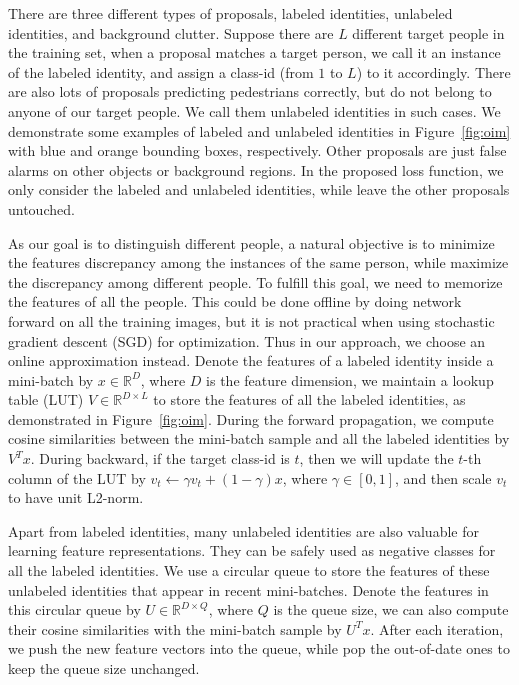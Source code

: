 There are three different types of proposals, labeled identities, unlabeled identities, and background clutter. Suppose there are $L$ different target people in the training set, when a proposal matches a target person, we call it an instance of the labeled identity, and assign a class-id (from $1$ to $L$) to it accordingly. There are also lots of proposals predicting pedestrians correctly, but do not belong to anyone of our target people. We call them unlabeled identities in such cases. We demonstrate some examples of labeled and unlabeled identities in Figure~\ref{fig:oim} with blue and orange bounding boxes, respectively. Other proposals are just false alarms on other objects or background regions. In the proposed loss function, we only consider the labeled and unlabeled identities, while leave the other proposals untouched.

As our goal is to distinguish different people, a natural objective is to minimize the features discrepancy among the instances of the same person, while maximize the discrepancy among different people. To fulfill this goal, we need to memorize the features of all the people. This could be done offline by doing network forward on all the training images, but it is not practical when using stochastic gradient descent (SGD) for optimization. Thus in our approach, we choose an online approximation instead. Denote the features of a labeled identity inside a mini-batch by $x\in \mathbb{R}^D$, where $D$ is the feature dimension, we maintain a lookup table (LUT) $V\in \mathbb{R}^{D\times L}$ to store the features of all the labeled identities, as demonstrated in Figure~\ref{fig:oim}. During the forward propagation, we compute cosine similarities between the mini-batch sample and all the labeled identities by $V^T x$. During backward, if the target class-id is $t$, then we will update the $t$-th column of the LUT by $v_t \gets \gamma v_t + (1-\gamma) x$, where $\gamma \in [0, 1]$, and then scale $v_t$ to have unit L2-norm.

Apart from labeled identities, many unlabeled identities are also valuable for learning feature representations. They can be safely used as negative classes for all the labeled identities. We use a circular queue to store the features of these unlabeled identities that appear in recent mini-batches. Denote the features in this circular queue by $U\in \mathbb{R}^{D\times Q}$, where $Q$ is the queue size, we can also compute their cosine similarities with the mini-batch sample by $U^Tx$. After each iteration, we push the new feature vectors into the queue, while pop the out-of-date ones to keep the queue size unchanged.


